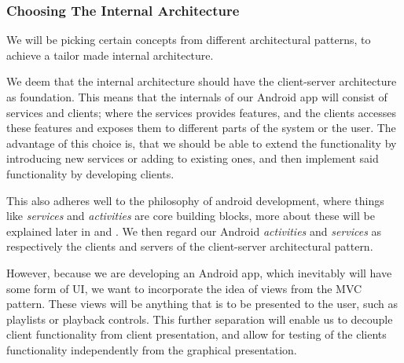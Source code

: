 \subsubsection{Choosing The Internal Architecture}
We will be picking certain concepts from different architectural patterns, to achieve a tailor made internal architecture.

We deem that the internal architecture should have the client-server architecture as foundation.
This means that the internals of our Android app will consist of services and clients;
where the services provides features, and the clients accesses these features and exposes them to different parts of the system or the user.
The advantage of this choice is, that we should be able to extend the functionality by introducing new services or adding to existing ones, and then implement said functionality by developing clients.

This also adheres well to the philosophy of android development, where things like \textit{services} and \textit{activities} are core building blocks, more about these will be explained later in  and .
We then regard our Android \textit{activities} and \textit{services} as respectively the clients and servers of the client-server architectural pattern.

However, because we are developing an Android app, which inevitably will have some form of \ac{UI}, we want to incorporate the idea of views from the \ac{MVC} pattern.
These views will be anything that is to be presented to the user, such as playlists or playback controls.
This further separation will enable us to decouple client functionality from client presentation, and allow for testing of the clients functionality independently from the graphical presentation.

